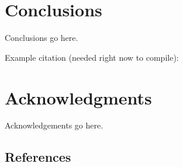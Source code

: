 \documentclass{sig-alternate-05-2015}
\begin{document}
\section{Conclusions}

Conclusions go here.

Example citation (needed right now to compile):\cite{Lamport:LaTeX}


\section{Acknowledgments}

Acknowledgements go here.

%

%
%


\subsection{References}
\end{document}
